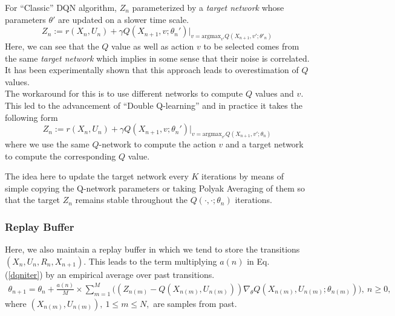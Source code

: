 \documentclass{article}
\theoremstyle{definition}
\begin{document}
For ``Classic'' DQN \cite{mnih2015humanlevel} algorithm, $Z_n$ parameterized by a \textit{target network} whose parameters $\theta'$ are updated on a slower time scale.
\begin{equation}
Z_n := r(X_n,U_n)+\gamma Q(X_{n+1},v;\theta_n')\Big|_{v = \mbox{argmax}_{v'} Q(X_{n+1}, v' ; \theta'_n)} \label{DQN}
\end{equation}
Here, we can see that the $Q$ value as well as action $v$ to be selected comes from the same \textit{target network} which implies in some sense that their noise is correlated. It has been experimentally shown that this approach leads to overestimation of $Q$ values.\\

The workaround for this is to use different networks to compute $Q$ values and $v$. This led to the advancement of ``Double Q-learning'' \cite{DBLP:journals/corr/HasseltGS15} and in practice it takes the following form
\begin{equation}
Z_n := r(X_n,U_n)+\gamma Q(X_{n+1},v;\theta_n')\Big|_{v = \mbox{argmax}_{v'} Q(X_{n+1}, v' ; \theta_n)}
\end{equation}
where we use the same $Q$-network to compute the action $v$ and a target network to compute the corresponding $Q$ value.

The idea here to update the target network every $K$ iterations by means of simple copying the Q-network parameters or taking Polyak Averaging of them so that the target $Z_n$ remains stable throughout the $Q(\cdot,\cdot;\theta_n)$ iterations. 

\subsubsection*{Replay Buffer}
Here, we also maintain a replay buffer in which we tend to store the transitions $(X_n,U_n,R_n,X_{n+1})$. This leads to the term multiplying $a(n)$ in Eq. (\ref{dqniter}) by an empirical average over past transitions.
\begin{eqnarray}
\label{replaybuffer}
\theta_{n+1} = \theta_n + \frac{a(n)}{M}\times\sum_{m=1}^M\Bigg((Z_{n(m)} - Q(X_{n(m)}, U_{n(m)}))\nabla_\theta Q(X_{n(m)}, U_{n(m)}; \theta_{n(m)})\Bigg), \ n \geq 0, 
\end{eqnarray}
where $(X_{n(m)}, U_{n(m)}),\ 1 \leq m \leq N,$ are samples from past. 
\end{document}
